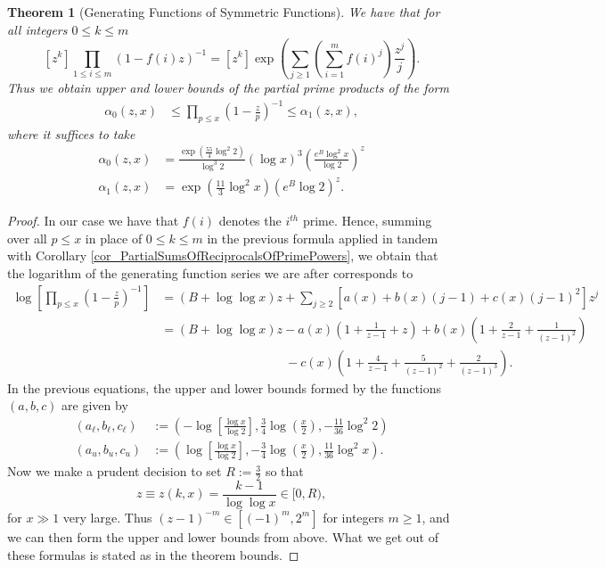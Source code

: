 \documentclass[11pt,reqno,a4letter]{article}
\numberwithin{figure}{section}
\numberwithin{table}{section}
\theoremstyle{plain}
\newtheorem{theorem}{Theorem}
\numberwithin{theorem}{section}
\theoremstyle{definition}
\begin{document}
\begin{theorem}[Generating Functions of Symmetric Functions] 
\label{theorem_GFs_SymmFuncs_SumsOfRecipOfPowsOfPrimes} 
We have that for all integers $0 \leq k \leq m$
\[
[z^k] \prod_{1 \leq i \leq m} (1-f(i) z)^{-1} = [z^k] \exp\left(\sum_{j \geq 1} 
     \left(\sum_{i=1}^m f(i)^j\right) \frac{z^j}{j}\right). 
\]
Thus we obtain upper and lower bounds of the partial prime products of the form
\begin{align*} 
\alpha_0(z, x) & \leq \prod_{p \leq x} \left(1-\frac{z}{p}\right)^{-1} \leq \alpha_1(z, x), 
\end{align*} 
where it suffices to take 
\begin{align*}
\alpha_0(z, x) & = \frac{\exp\left(\frac{55}{4} \log^2 2\right)}{\log^3 2} (\log x)^3 
     \left(\frac{e^{B} \log^2 x}{\log 2}\right)^{z} \\ 
\alpha_1(z, x) & = \exp\left(\frac{11}{3} \log^2 x\right) \left(e^{B} \log 2\right)^{z}. 
\end{align*}  
\end{theorem} 
\begin{proof} 
In our case we have that $f(i)$ denotes the $i^{th}$ prime. Hence, summing over all $p \leq x$ 
in place of $0 \leq k \leq m$ in the previous formula applied in tandem with 
Corollary \ref{cor_PartialSumsOfReciprocalsOfPrimePowers}, we obtain that the logarithm of the 
generating function series we are after corresponds to 
\begin{align*} 
\log\left[\prod_{p \leq x} \left(1-\frac{z}{p}\right)^{-1}\right] & = (B + \log\log x) z + 
     \sum_{j \geq 2} \left[a(x) + b(x)(j-1) + c(x) (j-1)^2\right] z^j \\ 
     & = (B + \log\log x) z - a(x) \left(1 + \frac{1}{z-1} + z\right) + b(x) \left( 
     1 + \frac{2}{z-1} + \frac{1}{(z-1)^2}\right) \\ 
     & \phantom{= (B + \log\log x) z\ } - 
     c(x) \left( 
     1 + \frac{4}{z-1} + \frac{5}{(z-1)^2} + \frac{2}{(z-1)^3}\right). 
\end{align*} 
In the previous equations, the upper and lower bounds formed by the functions $(a,b,c)$ are 
given by 
\begin{align*} 
(a_{\ell}, b_{\ell}, c_{\ell}) & := \left(-\log\left[\frac{\log x}{\log 2}\right], 
     \frac{3}{4} \log\left(\frac{x}{2}\right), - \frac{11}{36} \log^2 2\right) \\ 
(a_u, b_u, c_u) & := \left(\log\left[\frac{\log x}{\log 2}\right], 
     -\frac{3}{4} \log\left(\frac{x}{2}\right), \frac{11}{36} \log^2 x\right). 
\end{align*} 
Now we make a prudent decision to set $R := \frac{3}{2}$ so that 
$$z \equiv z(k, x) = \frac{k-1}{\log\log x} \in [0, R),$$ for $x \gg 1$ very large. 
Thus $(z-1)^{-m} \in [(-1)^m, 2^m]$ for integers $m \geq 1$, and we can then form the upper and 
lower bounds from above. What we get out of these formulas is stated as in the theorem bounds. 
\end{proof} 
\end{document}
